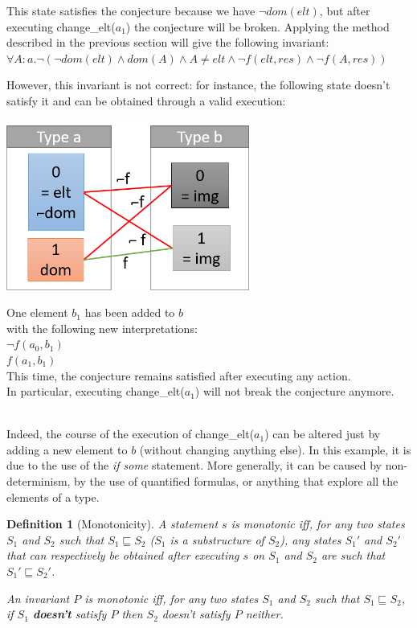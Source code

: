 \documentclass[11pt,a4paper,oldfontcommands,openany]{memoir}
\newtheorem*{definition}{Definition}
\begin{document}
    This state satisfies the conjecture because we have \(\neg dom(elt)\), but after executing change_elt(\(a_1\)) the conjecture will be broken.
    Applying the method described in the previous section will give the following invariant:
    \(\forall A:a. \neg(\neg dom(elt) \land dom(A) \land A \neq elt \land \neg f(elt,res) \land \neg f(A,res))\)

    However, this invariant is not correct: for instance, the following state doesn't satisfy it and can be obtained through a valid execution:

    \begin{minipage}{0.45\textwidth}
        \includegraphics[width=8cm]{NonMonotonicExValid}
    \end{minipage} \hfill
    \begin{minipage}{0.45\textwidth}
        One element \(b_1\) has been added to \(b\)\\
        with the following new interpretations:\\
        \(\neg f(a_0,b_1)\)\\
        \(f(a_1,b_1)\)\\
        This time, the conjecture remains satisfied after executing any action.\\
        In particular, executing change_elt(\(a_1\)) will not break the conjecture anymore.
    \end{minipage}\\

    Indeed, the course of the execution of change_elt(\(a_1\)) can be altered just by adding a new element to \(b\)
    (without changing anything else). In this example, it is due to the use of the \textit{if some} statement.
    More generally, it can be caused by non-determinism, by the use of quantified formulas, or anything that explore all the elements of a type.

    \begin{definition}[Monotonicity]
        A statement \(s\) is monotonic iff, for any two states \(S_1\) and \(S_2\) such that \(S_1 \sqsubseteq S_2\)
        (\(S_1\) is a substructure of \(S_2\)), any states \(S_1'\) and \(S_2'\) that can respectively be obtained after executing
        \(s\) on \(S_1\) and \(S_2\) are such that \(S_1' \sqsubseteq S_2'\).

        An invariant \(P\) is monotonic iff, for any two states \(S_1\) and \(S_2\) such that \(S_1 \sqsubseteq S_2\),
        if \(S_1\) \textbf{doesn't} satisfy \(P\) then \(S_2\) doesn't satisfy \(P\) neither.
    \end{definition}
\end{document}
